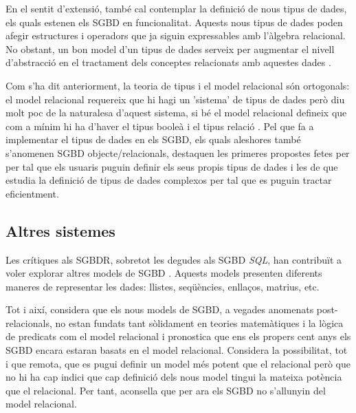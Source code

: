 
En el sentit d'extensió, també cal contemplar la definició de nous
tipus de dades, els quals estenen els SGBD en funcionalitat.  Aquests
nous tipus de dades poden afegir estructures i operadors que ja siguin
expressables amb l'àlgebra relacional. No obstant, un bon model d'un
tipus de dades serveix per augmentar el nivell d'abstracció en el
tractament dels conceptes relacionats amb aquestes
dades
\parencite{date02:_tempor_data_relat_model}. %

Com s'ha dit anteriorment, la teoria de tipus i el model relacional
són ortogonals: el model relacional requereix que hi hagi un 'sistema'
de tipus de dades però diu molt poc de la naturalesa d'aquest sistema,
si bé el model relacional defineix que com a mínim hi ha d'haver el
tipus booleà i el tipus
relació \parencite{date:thethirdmanifesto}. Pel que fa a implementar
el tipus de dades en els SGBD, els quals aleshores també s'anomenen
SGBD objecte/relacionals, destaquen les primeres propostes fetes per
\textcite{stonebraker86} per tal que els usuaris puguin definir els
seus propis tipus de dades i les de \textcite{seshadri98:_enhan} que
estudia la definició de tipus de dades complexos per tal que es puguin
tractar eficientment.


 




\subsection{Altres sistemes}

Les crítiques als SGBDR, sobretot les degudes als SGBD
\emph{SQL}, han contribuït a voler explorar altres models de
SGBD \parencite{stonebraker09}. Aquests models presenten diferents
maneres de representar les dades: llistes, seqüències, enllaços,
matrius, etc.

Tot i així, \textcite[cap.~21--25]{date06} considera que els nous
models de SGBD, a vegades anomenats post-relacionals, no estan fundats
tant sòlidament en teories matemàtiques i la lògica de predicats com
el model relacional i pronostica que ens els propers cent anys els
SGBD encara estaran basats en el model
relacional. %
Considera la possibilitat, tot i que remota, que es pugui definir un
model més potent que el relacional però que no hi ha cap indici que
cap definició dels nous model tingui la mateixa potència que el
relacional. Per tant, aconsella que per ara els SGBD no s'allunyin del
model relacional. %





